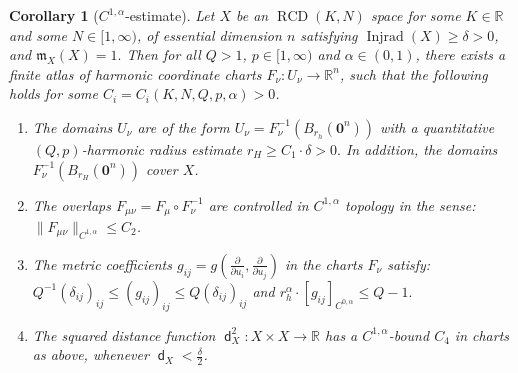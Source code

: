 \documentclass[11pt,reqno]{amsart}
\newtheorem{corollary}[theorem]{Corollary}
\theoremstyle{definition}
\numberwithin{equation}{section}
\newcommand{\bo}{\bm{0}}
\newcommand{\meas}{\mathfrak{m}}
\DeclareMathOperator{\dist}{\mathsf{d}}
\DeclareMathOperator{\Injrad}{Injrad}
\DeclareMathOperator{\RCD}{RCD}
\begin{document}
\begin{corollary}[$C^{1, \alpha}$-estimate]\label{asjasoajspa}
Let $X$ be an $\RCD(K, N)$ space for some $K \in \mathbb{R}$ and some $N \in [1, \infty)$, of essential dimension $n$ satisfying 
    $
         \Injrad(X) \ge \delta>0$, and $\meas_X(X)=1.
$
Then for all $Q>1$, $p \in [1, \infty)$ and $\alpha \in (0,1)$, there exists a finite atlas of harmonic coordinate charts $F_{\nu}:U_{\nu} \to \mathbb{R}^n$, such that the following holds for some $C_i=C_i(K, N,  Q, p, \alpha)>0$.
\begin{enumerate}
\item The domains $U_{\nu}$ are of the form $U_{\nu}=F_{\nu}^{-1}(B_{r_h}(\bo^n))$ with a quantitative $(Q, p)$-harmonic radius estimate
$
r_H \ge C_1 \cdot \delta>0.
$
In addition, the domains $F_{\nu}^{-1}(B_{r_H}(\bo^n))$ cover $X$.
\item The overlaps $F_{\mu \nu}=F_{\mu} \circ F_{\nu}^{-1}$ are controlled in $C^{1, \alpha}$ topology in the sense:
$
\|F_{\mu \nu}\|_{C^{1, \alpha}} \le C_2$.
\item The metric coefficients $g_{ij}=g(\frac{\partial}{\partial u_i}, \frac{\partial}{\partial u_j})$ in the charts $F_{\nu}$ satisfy:
$Q^{-1}(\delta_{ij})_{ij} \le (g_{ij})_{ij} \le Q(\delta_{ij})_{ij}$ and $ r_h^{\alpha} \cdot [g_{ij}]_{C^{0,\alpha}} \le Q-1.$
\item The squared distance function $\dist_X^2: X \times X \to \mathbb{R}$ has a $C^{1, \alpha}$-bound $C_4$ in charts as above, whenever $\dist_X <\frac{\delta}{2}$.
\end{enumerate}
\end{corollary}
\end{document}
